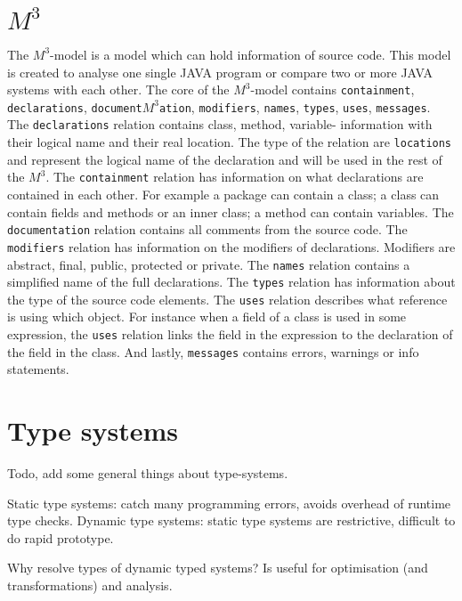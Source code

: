 \documentclass[../main.tex]{subfiles}
\begin{document}
    \section{$M^3$}
    The $M^3$-model is a model which can hold information of source code\cite{Ana:13}.
    This model is created to analyse one single JAVA program or compare two or more JAVA systems with each other.
    The core of the $M^3$-model contains \texttt{containment}, \texttt{declarations}, \texttt{document$M^3$ation}, \texttt{modifiers}, \texttt{names}, \texttt{types}, \texttt{uses}, \texttt{messages}.
    \\
    The \texttt{declarations} relation contains class, method, variable- information with their logical name and their real location. The type of the relation are \texttt{locations} and represent the logical name of the declaration and will be used in the rest of the $M^3$.
    The \texttt{containment} relation has information on what declarations are contained in each other. For example a package can contain a class; a class can contain fields and methods or an inner class; a method can contain variables.    
    The \texttt{documentation} relation contains all comments from the source code. 
    The \texttt{modifiers} relation has information on the modifiers of declarations. Modifiers are abstract, final, public, protected or private.
    The \texttt{names} relation contains a simplified name of the full declarations.
    The \texttt{types} relation has information about the type of the source code elements.
    The \texttt{uses} relation describes what reference is using which object. For instance when a field of a class is used in some expression, the \texttt{uses} relation links the field in the expression to the declaration of the field in the class.
    And lastly, \texttt{messages} contains errors, warnings or info statements.
    
    \section{Type systems}
    Todo, add some general things about type-systems.
    
    Static type systems: catch many programming errors, avoids overhead of runtime type checks.
    Dynamic type systems: static type systems are restrictive, difficult to do rapid prototype.
    
    Why resolve types of dynamic typed systems?
    Is useful for optimisation (and transformations) and analysis.
    
\end{document}
